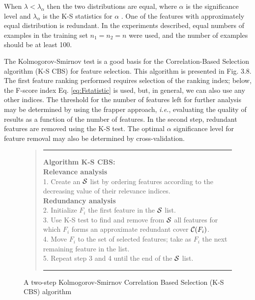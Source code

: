 \documentclass[a4paper,fleqn]{report}
\def\ie{{\em i.e.}}
\newcommand\cS{{\cal S}}
\newcommand\cC{{\cal C}}
\begin{document}
When $\lambda < \lambda_{\alpha}$ then the two distributions are equal, where $\alpha$ is the significance level and $\lambda_{\alpha}$ is the K-S statistics for $\alpha$ \cite{Evans_2000}.
One of the features with approximately equal distribution is redundant.
In the experiments described, equal numbers of examples in the training set  $n_1=n_2=n$ were used, and the number of examples should be at least 100.


The Kolmogorov-Smirnov test is a good basis for the Correlation-Based Selection algorithm (K-S CBS) for feature selection.
This algorithm is presented in Fig. 3.8. %
The first feature ranking performed requires selection of the 
ranking index; below, the F-score index  Eq. \ref{eq:Fstatistic} is used, but, in general, we can also use any other indices.
The threshold for the number of features left for further analysis may be 
determined 
by using the frapper approach, \ie, evaluating the quality of results as a function of the number 
of features.
In the second step, redundant features are removed using the K-S test. The optimal $\alpha$ significance level for feature 
removal may also be determined by cross-validation.

\begin{figure}[h] \label{Fig:KSCBS}
\begin{quote}
\hrule width 5.6 in
\vspace{0.1cm}
{\bf Algorithm K-S CBS:} \\
{\bf Relevance analysis} \\
1. Create an $\cS$ list by ordering features according to the decreasing value of their relevance indices. \\
{\bf Redundancy analysis} \\
2. Initialize $F_i$ the first feature in the $\cS$ list. \\
3. Use K-S test to find and remove from $\cS$ all features for which $F_i$ forms an approximate redundant cover $\cC(F_i)$. \\
4. Move $F_i$ to the set of selected features; take as $F_i$ the next remaining feature in the list.\\
5. Repeat step 3 and 4 until the end of the $\cS$ list.
\vspace{0.1cm}
\hrule width 5.6 in
\end{quote}
\caption{ A two-step Kolmogorov-Smirnov Correlation Based Selection (K-S CBS) algorithm}
\end{figure}
\end{document}
